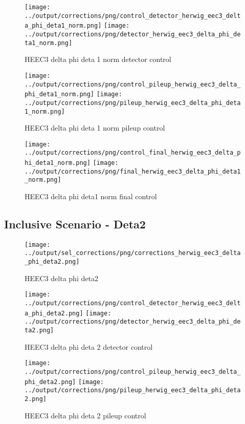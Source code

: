 \documentclass[11pt]{book}
\begin{document}
\begin{figure}[ht]
\centering
\texttt{[image: ../output/corrections/png/control\_detector\_herwig\_eec3\_delta\_phi\_deta1\_norm.png]}
\texttt{[image: ../output/corrections/png/detector\_herwig\_eec3\_delta\_phi\_deta1\_norm.png]}
\caption{HEEC3 delta phi deta 1 norm detector control}
\label{fig:HEEC3_delta_phi_deta1_norm_detector_control}
\end{figure}

\begin{figure}[ht]
\centering
\texttt{[image: ../output/corrections/png/control\_pileup\_herwig\_eec3\_delta\_phi\_deta1\_norm.png]}
\texttt{[image: ../output/corrections/png/pileup\_herwig\_eec3\_delta\_phi\_deta1\_norm.png]}
\caption{HEEC3 delta phi deta 1 norm pileup control}
\label{fig:HEEC3_delta_phi_deta1_norm_pileup_control}
\end{figure}

\begin{figure}[ht]
\centering
\texttt{[image: ../output/corrections/png/control\_final\_herwig\_eec3\_delta\_phi\_deta1\_norm.png]}
\texttt{[image: ../output/corrections/png/final\_herwig\_eec3\_delta\_phi\_deta1\_norm.png]}
\caption{HEEC3 delta phi deta1 norm final control}
\label{fig:HEEC3_delta_phi_deta1_norm_final_control}
\end{figure}

\clearpage
\subsection{Inclusive Scenario - Deta2}
\begin{figure}[ht]
\centering
\texttt{[image: ../output/sel\_corrections/png/corrections\_herwig\_eec3\_delta\_phi\_deta2.png]}
\caption{HEEC3 delta phi deta2}
\label{fig:HEEC3_delta_phi_deta2}
\end{figure}

\begin{figure}[ht]
\centering
\texttt{[image: ../output/corrections/png/control\_detector\_herwig\_eec3\_delta\_phi\_deta2.png]}
\texttt{[image: ../output/corrections/png/detector\_herwig\_eec3\_delta\_phi\_deta2.png]}
\caption{HEEC3 delta phi deta 2 detector control}
\label{fig:HEEC3_delta_phi_deta2_detector_control}
\end{figure}

\begin{figure}[ht]
\centering
\texttt{[image: ../output/corrections/png/control\_pileup\_herwig\_eec3\_delta\_phi\_deta2.png]}
\texttt{[image: ../output/corrections/png/pileup\_herwig\_eec3\_delta\_phi\_deta2.png]}
\caption{HEEC3 delta phi deta 2 pileup control}
\label{fig:HEEC3_delta_phi_deta2_pileup_control}
\end{figure}
\end{document}
